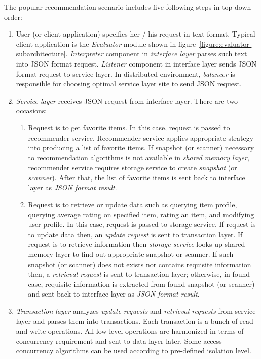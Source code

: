 \documentclass[a4paper,twoside]{article}
\begin{document}
The popular recommendation scenario includes five following steps in top-down order:
\begin{enumerate}
\item User (or client application) specifies her / his request in text format. Typical client application is the \textit{Evaluator} module shown in figure~\ref{figure:evaluator-subarchitecture}. \textit{Interpreter} component in \textit{interface layer} parses such text into JSON format request. \textit{Listener} component in interface layer sends JSON format request to service layer. In distributed environment, \textit{balancer} is responsible for choosing optimal service layer site to send JSON request.
\item \textit{Service layer} receives JSON request from interface layer. There are two occasions:
  \begin{enumerate}
  \item Request is to get favorite items. In this case, request is passed to recommender service. Recommender service applies appropriate strategy into producing a list of favorite items. If snapshot (or scanner) necessary to recommendation algorithms is not available in \textit{shared memory layer}, recommender service requires storage service to create \textit{snapshot} (or \textit{scanner}). After that, the list of favorite items is sent back to interface layer as \textit{JSON format result}.
  \item Request is to retrieve or update data such as querying item profile, querying average rating on specified item, rating an item, and modifying user profile. In this case, request is passed to storage service. If request is to update data then, an \textit{update request} is sent to transaction layer. If request is to retrieve information then \textit{storage service} looks up shared memory layer to find out appropriate snapshot or scanner. If such snapshot (or scanner) does not exists nor contains requisite information then, a \textit{retrieval request} is sent to transaction layer; otherwise, in found case, requisite information is extracted from found snapshot (or scanner) and sent back to interface layer as \textit{JSON format result}.
  \end{enumerate}
\item \textit{Transaction layer} analyzes \textit{update requests} and \textit{retrieval requests} from service layer and parses them into transactions. Each transaction is a bunch of read and write operations. All low-level operations are harmonized in terms of concurrency requirement and sent to data layer later. Some access concurrency algorithms can be used according to pre-defined isolation level.

\end{enumerate}
\end{document}
